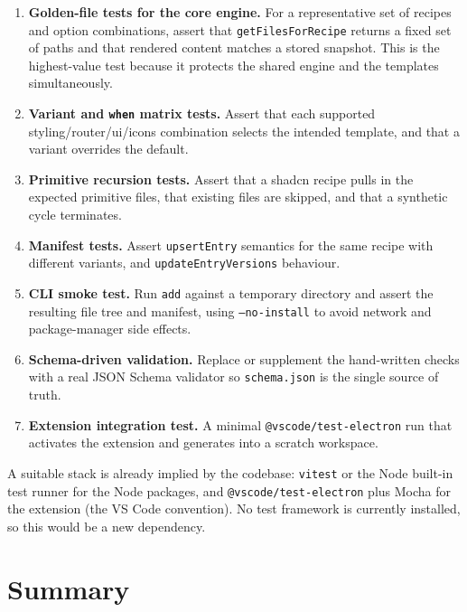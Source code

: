 \begin{enumerate}
  \item \textbf{Golden-file tests for the core engine.} For a representative set
        of recipes and option combinations, assert that \texttt{getFilesForRecipe}
        returns a fixed set of paths and that rendered content matches a stored
        snapshot. This is the highest-value test because it protects the shared
        engine and the templates simultaneously.
  \item \textbf{Variant and \texttt{when} matrix tests.} Assert that each
        supported styling/router/ui/icons combination selects the intended
        template, and that a variant overrides the default.
  \item \textbf{Primitive recursion tests.} Assert that a shadcn recipe pulls in
        the expected primitive files, that existing files are skipped, and that a
        synthetic cycle terminates.
  \item \textbf{Manifest tests.} Assert \texttt{upsertEntry} semantics for the
        same recipe with different variants, and \texttt{updateEntryVersions}
        behaviour.
  \item \textbf{CLI smoke test.} Run \texttt{add} against a temporary directory
        and assert the resulting file tree and manifest, using
        \texttt{--no-install} to avoid network and package-manager side effects.
  \item \textbf{Schema-driven validation.} Replace or supplement the hand-written
        checks with a real JSON Schema validator so \texttt{schema.json} is the
        single source of truth.
  \item \textbf{Extension integration test.} A minimal
        \texttt{@vscode/test-electron} run that activates the extension and
        generates into a scratch workspace.
\end{enumerate}

A suitable stack is already implied by the codebase: \texttt{vitest} or the
Node built-in test runner for the Node packages, and
\texttt{@vscode/test-electron} plus Mocha for the extension (the VS Code
convention). No test framework is currently installed, so this would be a new
dependency.

\section{Summary}

